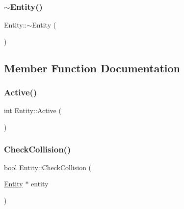 \mbox{\label{classEntity_adf6d3f7cb1b2ba029b6b048a395cc8ae}} 
\subsubsection{\texorpdfstring{$\sim$\+Entity()}{~Entity()}}
{\footnotesize\ttfamily Entity\+::$\sim$\+Entity (\begin{DoxyParamCaption}{ }\end{DoxyParamCaption})}



\subsection{Member Function Documentation}
\mbox{\label{classEntity_ae71d6f69f40deb56a6357bb4bf750091}} 
\subsubsection{\texorpdfstring{Active()}{Active()}}
{\footnotesize\ttfamily int Entity\+::\+Active (\begin{DoxyParamCaption}{ }\end{DoxyParamCaption})\hspace{0.3cm}{\ttfamily [inline]}}

\mbox{\label{classEntity_a3c39519c4beb655b319767606413b7d6}} 
\subsubsection{\texorpdfstring{Check\+Collision()}{CheckCollision()}}
{\footnotesize\ttfamily bool Entity\+::\+Check\+Collision (\begin{DoxyParamCaption}\item[{\hyperlink{classEntity}{Entity} $\ast$}]{entity }\end{DoxyParamCaption})}

\mbox{\label{classEntity_a7fefffa6364b37cda22e713ab316fcc5}} 
